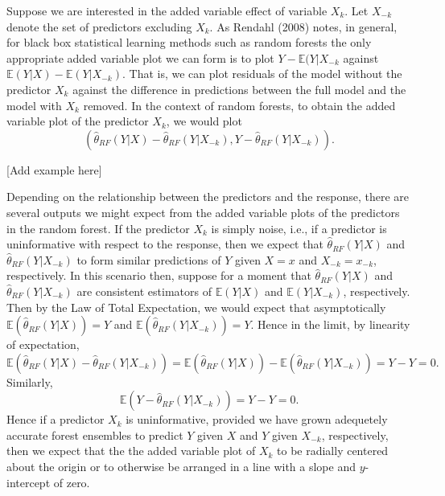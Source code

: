 \documentclass[12pt,twoside]{reedthesis}
\theoremstyle{definition}
\theoremstyle{definition}
\theoremstyle{definition}
\theoremstyle{remark}
\begin{document}
Suppose we are interested in the added variable effect of variable
\(X_k\). Let \(X_{-k}\) denote the set of predictors excluding \(X_k\).
As Rendahl (2008) notes, in general, for black box statistical learning
methods such as random forests the only appropriate added variable plot
we can form is to plot \(Y-\mathbb{E}(Y|X_{-k}\) against
\(\mathbb{E}(Y|X)-\mathbb{E}(Y|X_{-k})\). That is, we can plot residuals
of the model without the predictor \(X_k\) against the difference in
predictions between the full model and the model with \(X_k\) removed.
In the context of random forests, to obtain the added variable plot of
the predictor \(X_k\), we would plot
\[(\hat{\theta}_{RF}(Y|X)-\hat{\theta}_{RF}(Y|X_{-k}), Y-\hat{\theta}_{RF}(Y|X_{-k})).\]

{[}Add example here{]}

Depending on the relationship between the predictors and the response,
there are several outputs we might expect from the added variable plots
of the predictors in the random forest. If the predictor \(X_k\) is
simply noise, i.e., if a predictor is uninformative with respect to the
response, then we expect that \(\hat{\theta}_{RF}(Y|X)\) and
\(\hat{\theta}_{RF}(Y|X_{-k})\) to form similar predictions of \(Y\)
given \(X=x\) and \(X_{-k}=x_{-k}\), respectively. In this scenario
then, suppose for a moment that \(\hat{\theta}_{RF}(Y|X)\) and
\(\hat{\theta}_{RF}(Y|X_{-k})\) are consistent estimators of
\(\mathbb{E}(Y|X)\) and \(\mathbb{E}(Y|X_{-k})\), respectively. Then by
the Law of Total Expectation, we would expect that asymptotically
\(\mathbb{E}(\hat{\theta}_{RF}(Y|X))=Y\) and
\(\mathbb{E}(\hat{\theta}_{RF}(Y|X_{-k}))=Y\). Hence in the limit, by
linearity of expectation,
\[\mathbb{E}(\hat{\theta}_{RF}(Y|X)-\hat{\theta}_{RF}(Y|X_{-k}))=\mathbb{E}(\hat{\theta}_{RF}(Y|X))-\mathbb{E}(\hat{\theta}_{RF}(Y|X_{-k}))=Y-Y=0.\]
Similarly, \[\mathbb{E}(Y-\hat{\theta}_{RF}(Y|X_{-k}))=Y-Y=0.\] Hence if
a predictor \(X_k\) is uninformative, provided we have grown adequetely
accurate forest ensembles to predict \(Y\) given \(X\) and \(Y\) given
\(X_{-k}\), respectively, then we expect that the the added variable
plot of \(X_k\) to be radially centered about the origin or to otherwise
be arranged in a line with a slope and \(y\)-intercept of zero.
\end{document}
